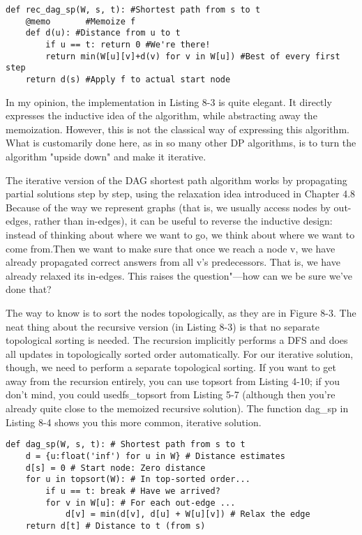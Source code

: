 \begin{lstlisting}[caption={Recursive, Memoized DAG Shortest Path}]
def rec_dag_sp(W, s, t): #Shortest path from s to t
    @memo       #Memoize f
    def d(u): #Distance from u to t
        if u == t: return 0 #We're there!
        return min(W[u][v]+d(v) for v in W[u]) #Best of every first step
    return d(s) #Apply f to actual start node
\end{lstlisting}

In my opinion, the implementation in Listing 8-3 is quite elegant. It directly expresses the inductive idea of the algorithm, while abstracting away the memoization. However, this is not the classical way of expressing this algorithm. What is customarily done here, as in so many other DP algorithms, is to turn the algorithm "upside down" and make it iterative.

The iterative version of the DAG shortest path algorithm works by propagating partial solutions step by step, using the relaxation idea introduced in Chapter 4.8 Because of the way we represent graphs (that is, we usually access nodes by out-edges, rather than in-edges), it can be useful to reverse the inductive design: instead of thinking about where we want to go, we think about where we want to come from.Then we want to make sure that once we reach a node v, we have already propagated correct answers from all v's predecessors. That is, we have already relaxed its in-edges. This raises the question"---how can we be sure we've done that?

The way to know is to sort the nodes topologically, as they are in Figure 8-3. The neat thing about the recursive version (in Listing 8-3) is that no separate topological sorting is needed. The recursion implicitly performs a DFS and does all updates in topologically sorted order automatically. For our iterative solution, though, we need to perform a separate topological sorting. If you want to get away from the recursion entirely, you can use topsort from Listing 4-10; if you don't mind, you could usedfs\_topsort from Listing 5-7 (although then you're already  quite close to the memoized recursive solution). The function dag\_sp in Listing 8-4 shows you this more common, iterative solution.

\begin{lstlisting}[caption= {DAG Shortest Path}]
def dag_sp(W, s, t): # Shortest path from s to t
    d = {u:float('inf') for u in W} # Distance estimates
    d[s] = 0 # Start node: Zero distance
    for u in topsort(W): # In top-sorted order...
        if u == t: break # Have we arrived?
        for v in W[u]: # For each out-edge ...
            d[v] = min(d[v], d[u] + W[u][v]) # Relax the edge
    return d[t] # Distance to t (from s)
\end{lstlisting}

